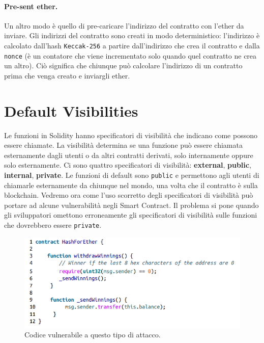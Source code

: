 \paragraph{Pre-sent ether.}

Un altro modo è quello di pre-caricare l'indirizzo del contratto con l'ether da
inviare. Gli
indirizzi del contratto sono creati in modo deterministico: l'indirizzo è
calcolato dall'hash \verb|Keccak-256| a partire dall'indirizzo che crea il
contratto e dalla \verb|nonce| (è un
contatore che viene incrementato solo quando quel contratto ne crea un altro).
Ciò significa
che chiunque può calcolare l'indirizzo di un contratto prima che venga creato e
inviargli ether.

\section{Default Visibilities}

Le funzioni in Solidity hanno specificatori di visibilità che indicano come
possono essere chiamate. La visibilità determina se una funzione può essere
chiamata esternamente dagli utenti o da altri contratti derivati, solo internamente
oppure solo esternamente.
Ci sono quattro specificatori di visibilità: \textbf{external}, \textbf{public},
\textbf{internal}, \textbf{private}.
Le funzioni di default sono \verb|public| e permettono agli utenti di chiamarle
esternamente da chiunque nel mondo, una volta che il contratto è sulla blockchain.
Vedremo ora come l'uso scorretto degli specificatori di visibilità può portare
ad alcune vulnerabilità negli Smart Contract.
Il problema si pone quando gli sviluppatori omettono erroneamente gli
specificatori di
visibilità sulle funzioni che dovrebbero essere \verb|private|.

\begin{figure}[H]
      \centering
      \includegraphics[width=12cm, keepaspectratio]{capitoli/ethereum/imgs/visibility.png}
      \caption{Codice vulnerabile a questo tipo di attacco.}
\end{figure}

